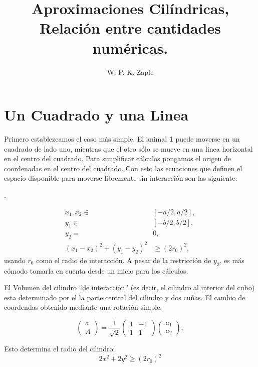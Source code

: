 \documentclass[letterpaperr,12pt]{article}
\title{Aproximaciones Cilíndricas, Relación entre cantidades numéricas.}
\author{W. P. K. Zapfe}
\newcommand{\Uno}{\textbf{1}\xspace}
\begin{document}
\maketitle

\section{Un Cuadrado y una Linea}

Primero establezcamos el caso más simple. El animal \Uno puede moverse
en un cuadrado de lado uno, mientras que el otro sólo se mueve en una linea
horizontal en el centro del cuadrado. Para simplificar cálculos
pongamos el origen de coordenadas en el centro del cuadrado.
Con esto las ecuaciones que definen el espacio disponible para
moverse libremente sin interacción son las siguiente:

.

\begin{align}
x_1,x_2 \in  & [ -a/2, a/2], \\
y_1\in & [ -b/2, b/2], \\
y_2 = & 0, \\
(x_1-x_2)^2+(y_1-y_2)^2 & \ge (2 r_0)^2,
\end{align}
usando $r_0$ como el radio de interacción. 
A pesar de la restricción de $y_2$, es más cómodo tomarla en cuenta
desde un inicio para los cálculos.

El Volumen del cilindro ``de interacción'' (es decir, el cilindro al
interior del cubo) esta determinado por el la parte central
del cilindro y dos cuñas. El cambio de coordendas obtenido
mediante una rotación simple:

\begin{equation}\label{rotacion}
  \begin{pmatrix}
    a \\
    A
  \end{pmatrix}
  =\frac{1}{\sqrt{2}}
  \begin{pmatrix}
    1 & -1 \\
    1 & 1
  \end{pmatrix}
  \begin{pmatrix}
    a_1 \\
    a_2
  \end{pmatrix},
\end{equation}

Esto determina el radio del cilindro:
\begin{equation}
2x^2+2y^2 \ge (2 r_0)^2
\end{equation}
\end{document}

